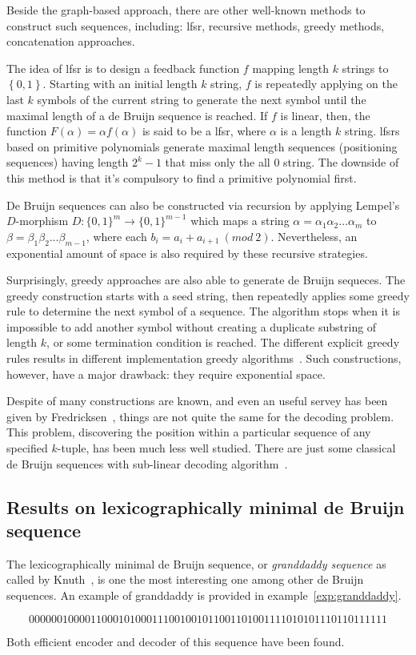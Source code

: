 Beside the graph-based approach, there are other well-known methods to construct such sequences, including: \gls{lfsr}, recursive methods, greedy methods, concatenation approaches.

The idea of \gls{lfsr} is to design a feedback function $f$ mapping length $k$ strings to $\left\{0,1\right\}$. Starting with an initial length $k$ string, $f$ is repeatedly applying on the last $k$ symbols of the current string to generate the next symbol until the maximal length of a de Bruijn sequence is reached. If $f$ is linear, then, the function $F(\alpha)= \alpha f(\alpha)$ is said to be a \gls{lfsr}, where $\alpha$ is a length $k$ string. \gls{lfsr}s based on primitive polynomials generate maximal length sequences (positioning sequences) having length $2^{k}-1$ that miss only the all $0$ string. The downside of this method is that it's compulsory to find a primitive polynomial first.

De Bruijn sequences can also be constructed via recursion by applying Lempel's $D$-morphism $D:\{0,1\}^{m}\to\{0,1\}^{m-1}$ which maps a string $\alpha = \alpha_{1}\alpha_{2}\ldots\alpha_{m}$ to $\beta = \beta_{1}\beta_{2}\ldots\beta_{m-1}$, where each $b_{i} = a_{i} + a_{i+1}\ (mod\ 2)$. Nevertheless, an exponential amount of space is also required by these recursive strategies. 

Surprisingly, greedy approaches are also able to generate de Bruijn sequeces. The greedy construction starts with a seed string, then repeatedly applies some greedy rule to determine the next symbol of a sequence. The algorithm stops when it is impossible to add another symbol without creating a duplicate substring of length $k$, or some termination condition is reached. The different explicit greedy rules results in different implementation greedy algorithms~\cite{martin1934problem,alhakim2010simple,fredricksen1982survey,alhakim2021revisiting}. Such constructions, however, have a major drawback: they require exponential space.

Despite of many constructions are known, and even an useful servey has been given by Fredricksen~\cite{fredricksen1982survey}, things are not quite the same for the decoding problem. This problem, discovering the position within a particular sequence of any specified $k$-tuple, has been much less well studied. There are just some classical de Bruijn sequences with sub-linear decoding algorithm~\cite{mitchell1996method,tuliani2001bruijn,kociumaka2016efficient}. 
\subsection{Results on lexicographically minimal de Bruijn sequence}
The lexicographically minimal de Bruijn sequence, or \textit{granddaddy sequence} as called by Knuth~\cite{knuth2013art}, is one the most interesting one among other de Bruijn sequences. An example of granddaddy is provided in example~\ref{exp:granddaddy}.
\begin{example}\label{exp:granddaddy}
    \[0000001000011000101000111001001011001101001111010101110110111111\]    
\end{example}
Both efficient encoder and decoder of this sequence have been found.

